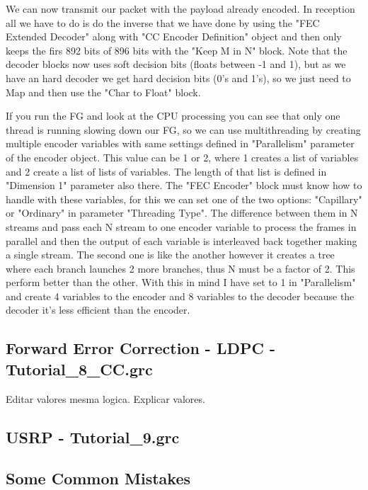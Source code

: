 \documentclass[a4paper, 10pt, conference]{ieeeconf}      %
\begin{document}
    We can now transmit our packet with the payload already encoded. In reception all we have to do is do the inverse that we have done by using the "FEC Extended Decoder" along with "CC Encoder Definition" object and then only keeps the firs 892 bits of 896 bits with the  "Keep M in N" block. Note that the decoder blocks now uses soft decision bits (floats between -1 and 1), but as we have an hard decoder we get hard decision bits (0's and 1's), so we just need to Map and  then use the "Char to Float" block.
    
    If you run the FG and look at the CPU processing you can see that only one thread is running slowing down our FG, so we can use multithreading by creating multiple encoder variables with same settings defined in "Parallelism" parameter of the encoder object. This value can be 1 or 2, where 1 creates a list of variables and 2 create a list of lists of variables. The length of that list is defined in "Dimension 1" parameter also there. The "FEC Encoder" block must know how to handle with these variables, for this we can set one of the two options: "Capillary" or "Ordinary" in parameter "Threading Type". The difference between them in N streams and pass each N stream to one encoder variable to process the frames in parallel and then the output of each variable is interleaved back together making a single stream. The second one is like the another however it creates a tree where each branch launches 2 more branches, thus N must be a factor of 2. This perform better than the other. With this in mind I have set to 1 in "Parallelism" and create 4 variables to the encoder and 8 variables to the decoder because the decoder it's less efficient than the encoder.
    

\subsection{Forward Error Correction - LDPC - Tutorial\_8\_CC.grc}
Editar valores mesma logica. Explicar valores.

\subsection{USRP - Tutorial\_9.grc}




\subsection{Some Common Mistakes}
\end{document}
